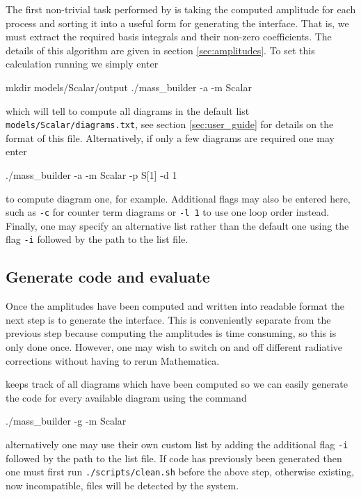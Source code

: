 The first non-trivial task performed by \mb is taking the computed amplitude for each process and sorting it into a useful form for generating the \tsil interface.  That is, we must extract the required basis integrals and their non-zero coefficients.  The details of this algorithm are given in section \ref{sec:amplitudes}.  To set this calculation running we simply enter
\begin{lstterm}
mkdir models/Scalar/output
./mass_builder -a -m Scalar
\end{lstterm}
which will tell \mb to compute all diagrams in the default list \lstinline{models/Scalar/diagrams.txt}, see section \ref{sec:user_guide} for details on the format of this file.  Alternatively, if only a few diagrams are required one may enter
\begin{lstterm}
./mass_builder -a -m Scalar -p S[1] -d 1
\end{lstterm}
to compute diagram one, for example.  Additional flags may also be entered here, such as \lstinline{-c} for counter term diagrams or \lstinline{-l 1} to use one loop order instead.  Finally, one may specify an alternative list rather than the default one using the flag \lstinline{-i} followed by the path to the list file.


\subsection{Generate code and evaluate}

Once the amplitudes have been computed and written into \mb readable format the next step is to generate the \tsil interface.  This is conveniently separate from the previous step because computing the amplitudes is time consuming, so this is only done once.  However, one may wish to switch on and off different radiative corrections without having to rerun Mathematica.

\mb keeps track of all diagrams which have been computed so we can easily generate the code for every available diagram using the command
\begin{lstterm}
./mass_builder -g -m Scalar
\end{lstterm}
alternatively one may use their own custom list by adding the additional flag \lstinline{-i} followed by the path to the list file.  If code has previously been generated then one must first run \lstinline{./scripts/clean.sh} before the above step, otherwise existing, now incompatible, files will be detected by the \cmake system.

